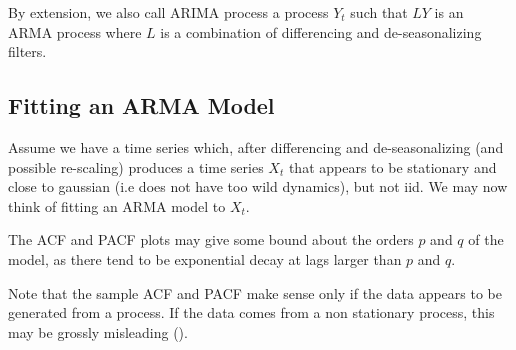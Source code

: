 By extension, we also call ARIMA process a process
 $Y_t$ such that $L Y$ is an ARMA process where $L$ is
 a combination of differencing and de-seasonalizing
 filters.
\subsection{Fitting an ARMA Model}
Assume we have a time series which, after differencing
and de-seasonalizing (and possible re-scaling)
produces a time series $X_t$ that appears to be
stationary and close to gaussian (i.e does not have
too wild dynamics), but not iid. We may now think of
fitting an ARMA model to $X_t$.

The ACF and PACF plots may give some bound about the
orders $p$ and $q$ of the model, as there tend to be
exponential decay at lags larger than $p$ and $q$.


Note that the sample ACF and PACF make sense only if
the data appears to be generated from a
 process. If the data comes from a non
stationary process, this may be grossly misleading
().
%
\begin{figure}
  \begin{center}
\end{center}
  \label{fig-acf-sprint}
\end{figure}
%
%
